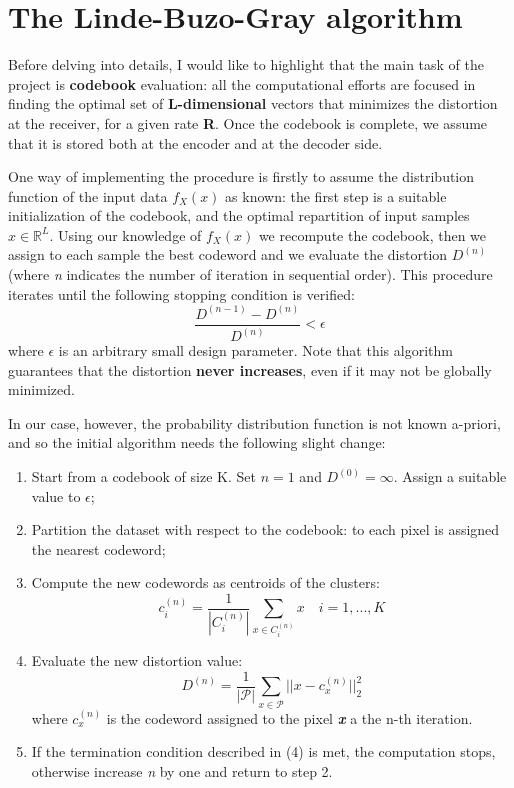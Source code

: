 \documentclass{report}
\begin{document}
\section{The Linde-Buzo-Gray algorithm}

Before delving into details, I would like to highlight that the main task of the project is \textbf{codebook} evaluation: all the computational efforts are focused in finding the optimal set of \textbf{L-dimensional} vectors that minimizes the distortion at the receiver, for a given rate \textbf{R}. Once the codebook is complete, we assume that it is stored both at the encoder and at the decoder side.

One way of implementing the procedure is firstly to assume the distribution function of the input data $f_X(x)$ as known:  the first step is a suitable initialization of the codebook, and the optimal repartition of input samples $ x \in \mathbb{R}^L$. Using our knowledge of $f_X(x)$ we recompute the codebook, then we assign to each sample the best codeword and we evaluate the distortion $D^{(n)}$ (where \textit{n} indicates the number of iteration in sequential order). This procedure iterates until the following stopping condition is verified: 
\begin{equation}
\frac{D^{(n-1)} - D^{(n)}}{D^{(n)}} < \epsilon
\end{equation}
where $\epsilon$ is an arbitrary small design parameter. Note that this algorithm guarantees that the distortion \textbf{never increases}, even if it may not be globally minimized.

In our case, however, the probability distribution function is not known a-priori, and so the initial algorithm needs the following slight change: 

\begin{enumerate}
	\item Start from a codebook of size K. Set $n = 1$ and $ D^{(0)} = \infty $. Assign a suitable value to $\epsilon$; %
	\item Partition the dataset with respect to the codebook: to each pixel is assigned the nearest codeword;
	\item Compute the new codewords as centroids of the clusters:
	\begin{equation}
	c_i^{(n)} = \frac{1}{|C_i^{(n)}|} \sum_{x \in C_i^{(n)}} x \quad i = 1,...,K
	\end{equation}
	\item Evaluate the new distortion value:
	\begin{equation}
	D^{(n)} = \frac{1}{|\mathcal{P}|} \sum_{x \in \mathcal{P}} ||x - c_x^{(n)}||_2^2
	\end{equation}
	where $c_x^{(n)}$ is the codeword assigned to the pixel \textbf{\textit{x}} a the n-th iteration.
	\item If the termination condition described in (4) is met, the computation stops, otherwise increase \textit{n} by one and return to step 2.
\end{enumerate}
\end{document}
